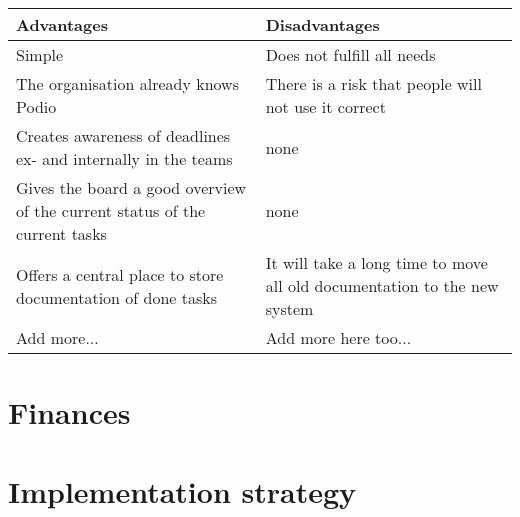 \begin{center}
    \begin{tabular}{ | p{7cm} | p{7cm} |}
    \hline
    \textbf{Advantages} & \textbf{Disadvantages}  \\ \hline
    Simple & Does not fulfill all needs  \\ \hline
    The organisation already knows Podio & There is a risk that people will not use it correct \\
    \hline
    Creates awareness of deadlines ex- and internally in the teams & none \\ \hline
    Gives the board a good overview of the current status of the current tasks & none \\ \hline
    Offers a central place to store documentation of done tasks & It will take a long time to move
    all old documentation to the new system \\ \hline
    Add more... & Add more here too... \\ 
    \hline
    \end{tabular}
\end{center}


\section{Finances}

\section{Implementation strategy}


